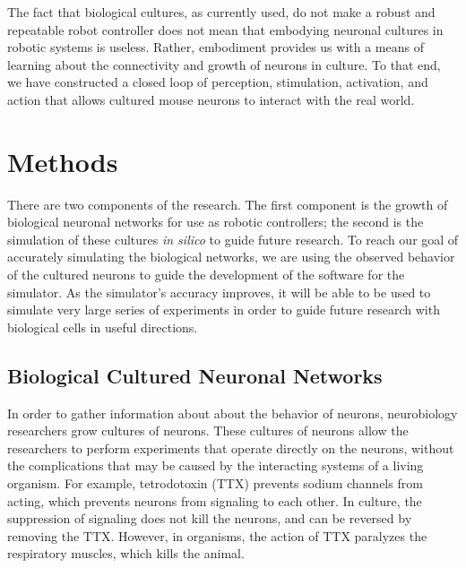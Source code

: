 \documentclass[letterpaper]{article}
\begin{document}
The fact that biological cultures, as currently used, do not make a robust and repeatable robot controller does not mean that embodying neuronal cultures in robotic systems is useless. 
Rather, embodiment provides us with a means of learning about the connectivity and growth of neurons in culture. 
To that end, we have constructed a closed loop of perception, stimulation, activation, and action that allows cultured mouse neurons to interact with the real world.

\section{Methods}

There are two components of the research. 
The first component is the growth of biological neuronal networks for use as robotic controllers; the second is the simulation of these cultures \textit{in silico} to guide future research. 
To reach our goal of accurately simulating the biological networks, we are using the observed behavior of the cultured neurons to guide the development of the software for the simulator.
As the simulator's accuracy improves, it will be able to be used to simulate very large series of experiments in order to guide future research with biological cells in useful directions. 

\subsection{Biological Cultured Neuronal Networks}

In order to gather information about about the behavior of neurons, neurobiology researchers grow cultures of neurons.
These cultures of neurons allow the researchers to perform experiments that operate directly on the neurons, without the complications that may be caused by the interacting systems of a living organism. 
For example, tetrodotoxin (TTX) prevents sodium channels from acting, which prevents neurons from signaling to each other. 
In culture, the suppression of signaling does not kill the neurons, and can be reversed by removing the TTX. 
However, in organisms, the action of TTX paralyzes the respiratory muscles, which kills the animal.  
\end{document}
